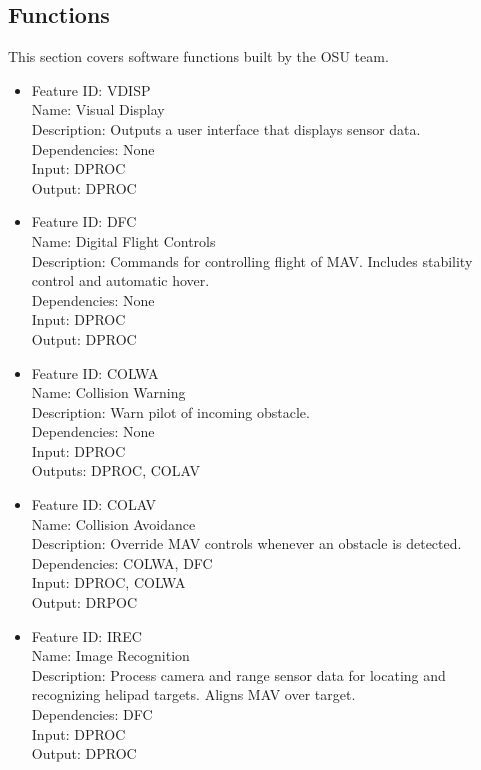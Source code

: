 \documentclass[onecolumn, draftclsnofoot, 10pt, compsoc]{IEEEtran}
\begin{document}
\subsection{Functions}
This section covers software functions built by the OSU team.
\begin{itemize}
    \item Feature ID: VDISP\\
Name: Visual Display\\
Description: Outputs a user interface that displays sensor data.\\
Dependencies: None\\
Input: DPROC\\
Output: DPROC
\item Feature ID: DFC\\
Name: Digital Flight Controls\\
Description: Commands for controlling flight of MAV. Includes stability control and automatic hover.\\
Dependencies: None\\
Input: DPROC\\
Output: DPROC
\item Feature ID: COLWA\\
Name: Collision Warning\\
Description: Warn pilot of incoming obstacle.\\
Dependencies: None\\
Input: DPROC\\
Outputs: DPROC, COLAV
\item Feature ID: COLAV\\
Name: Collision Avoidance\\
Description: Override MAV controls whenever an obstacle is detected.\\
Dependencies: COLWA, DFC\\
Input: DPROC, COLWA\\
Output: DRPOC
\item Feature ID: IREC\\
Name: Image Recognition\\
Description: Process camera and range sensor data for locating and recognizing helipad targets. Aligns MAV over target.\\
Dependencies: DFC\\
Input: DPROC\\
Output: DPROC
\end{itemize}
\end{document}
